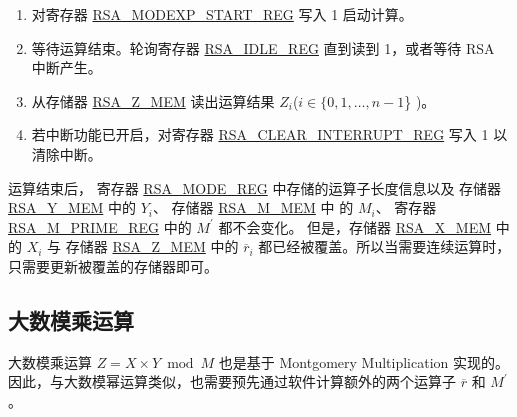 \documentclass[main\_\_CN.tex]{subfiles}
\begin{document}
\begin{enumerate}
    \item 对寄存器 \hyperref[regdesc:RSAMODEXPSTARTREG]{RSA\_MODEXP\_START\_REG} 写入 1 启动计算。

    \item 等待运算结束。轮询寄存器 \hyperref[regdesc:RSAIDLEREG]{RSA\_IDLE\_REG} 直到读到 1，或者等待 RSA 中断产生。
        
    \item 从存储器 \hyperref[regdesc:RSAmemory]{RSA\_Z\_MEM} 读出运算结果 \begin{math}Z_{i}\end{math}(\begin{math}i \in \{ 0, 1, \dots, n-1 \end{math}\} )。

    \item 若中断功能已开启，对寄存器 \hyperref[regdesc:RSACLEARINTERRUPTREG]{RSA\_CLEAR\_INTERRUPT\_REG} 写入 1 以清除中断。

\end{enumerate}

运算结束后，
寄存器 \hyperref[regdesc:RSAMODEXPMODEREG]{RSA\_MODE\_REG} 中存储的运算子长度信息以及
存储器 \hyperref[regdesc:RSAmemory]{RSA\_Y\_MEM} 中的 \begin{math}Y_{i}\end{math}、
存储器 \hyperref[regdesc:RSAmemory]{RSA\_M\_MEM} 中 的 \begin{math}M_{i}\end{math}、
寄存器 \hyperref[regdesc:RSAMPRIMEREG]{RSA\_M\_PRIME\_REG} 中的 \begin{math}M^{\prime}\end{math} 都不会变化。
但是，存储器 \hyperref[regdesc:RSAmemory]{RSA\_X\_MEM} 中的 \begin{math}X_{i}\end{math} 与
存储器 \hyperref[regdesc:RSAmemory]{RSA\_Z\_MEM} 中的 \begin{math}\overline{r}_{i}\end{math} 
都已经被覆盖。所以当需要连续运算时，只需要更新被覆盖的存储器即可。


\subsection{大数模乘运算}

大数模乘运算 \begin{math}Z = X \times Y \bmod M\end{math} 也是基于 Montgomery Multiplication 实现的。因此，与大数模幂运算类似，也需要预先通过软件计算额外的两个运算子
\begin{math}\overline{r}\end{math} 和 
\begin{math}M^{\prime}\end{math}。
\end{document}
